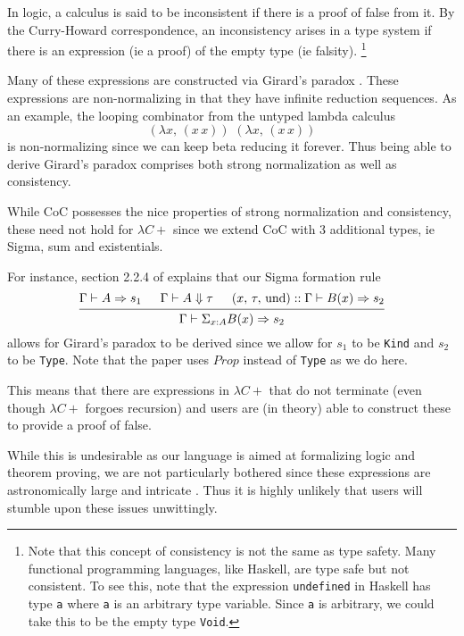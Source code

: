 \documentclass{article}
\begin{document}
In logic, a calculus is said to be inconsistent if there is a proof of false
from it.
By the Curry-Howard correspondence, an inconsistency arises in a type system if
there is an expression (ie a proof) of the empty type (ie falsity).
\footnote{
  Note that this concept of consistency is not the same as type safety.
  Many functional programming languages, like Haskell, are type safe but not
  consistent.
  To see this, note that the expression \texttt{undefined} in Haskell has type
  \texttt{a} where \texttt{a} is an arbitrary type variable.
  Since \texttt{a} is arbitrary, we could take this to be the empty type
  \texttt{Void}.
}

Many of these expressions are constructed via Girard's paradox
\cite{analysis_of_girard}. 
These expressions are non-normalizing in that they have infinite reduction
sequences.
As an example, the looping combinator from the untyped lambda calculus
 \[ (\lambda x, \, (x \, x)) \,\, (\lambda x, \, (x \, x)) \]
is non-normalizing since we can keep beta reducing it forever.
Thus being able to derive Girard's paradox comprises both strong normalization
as well as consistency.

While CoC possesses the nice properties of strong normalization and
consistency, these need not hold for $\lambda C+$
since we extend CoC with 3 additional types, ie Sigma, sum and existentials.

For instance, section 2.2.4 of \cite{extended_coc} explains that our
Sigma formation rule
 \[
    \begin{prooftree}
      \hypo{\Gamma \vdash A \Rightarrow s_1}
      \hypo{\Gamma \vdash A \Downarrow \tau}
      \hypo{(x, \, \tau, \, \text{und}) :: \Gamma \vdash B(x) \Rightarrow s_2}
      \infer3{\Gamma \vdash \Sigma_{x : A}B(x) \Rightarrow s_2}
    \end{prooftree}
 \]
allows for Girard's paradox to be derived since we allow for $s_1$ to be
\texttt{Kind} and $s_2$ to be \texttt{Type}.
Note that the paper uses $Prop$ instead of \texttt{Type} as we do here.

This means that there are expressions in $\lambda C+$ that do not
terminate (even though $\lambda C+$ forgoes recursion) and users are (in theory)
able to construct these to provide a proof of false.

While this is undesirable as our language is aimed at formalizing logic and
theorem proving, we are not particularly bothered since
these expressions are astronomically large and intricate
\cite{analysis_of_girard}. Thus it is highly unlikely that users will stumble
upon these issues unwittingly.
\end{document}
